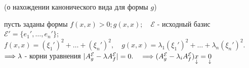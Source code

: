 \vspace{0.4cm}
\begin{shth}
    \begin{theorem} (о нахождении канонического вида для формы $ g $)
    \leavevmode \nl 
    
    пусть заданы формы $ f(x,x) > 0  ; g(x,x); \quad \mathcal{E}$ - исходный базис \\
    
    $ \mathcal{E}' = \{e_{1}', \ldots, e_{n}'\} $; \; $ f(x,x) = (\xi_{1}')^2 + \ldots + (\xi_{n}')^2, \quad g(x,x) = \lambda_{1} (\xi_{1}')^2 + \ldots + \lambda_{n} (\xi_{n}')^2.$ \\
    
    $ \Longrightarrow \lambda $ - корни уравнения $ |A_{g}^{\mathcal{E}} - \lambda A_{f}^{\mathcal{E}}| = 0. \quad \Longrightarrow  (A_{g}^{\mathcal{E}} - \lambda_{i} A_{f}^{\mathcal{E}}) \smash{\underset{\downarrow} {x}} = \smash{\underset{\downarrow} {0}}$
        
    \end{theorem}
\end{shth}

